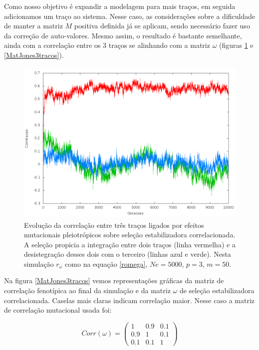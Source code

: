 Como nosso objetivo é expandir a modelagem para mais traços, em seguida
adicionamos um traço ao sistema. 
Nesse caso, as considerações sobre a dificuldade de manter a matriz $M$
positiva definida já se aplicam, sendo necessário fazer uso da correção
de auto-valores. 
Mesmo assim, o resultado é bastante semelhante, ainda com a correlação
entre os 3 traços se alinhando com a matriz $\omega$ (figuras
\ref{jones3tracos} e \ref{MatJones3tracos}). 

\begin{center}
\begin{figure}[htbp]
  \includegraphics[width=150mm, height=80mm]{figuras/jones3tracos.png}
  \caption{Evolução da correlação entre três traços ligados por efeitos
  mutacionais pleiotrópicos sobre seleção estabilizadora correlacionada.
  A seleção propicia a integração entre dois traços (linha vermelha) e a desistegração
  desses dois com o terceiro (linhas azul e verde). Nesta simulação
  $r_\omega$ como na equação \ref{romega}, $Ne=5000$, $p=3$, $m=50$.}
  \label{jones3tracos}
\end{figure}
\end{center}

Na figura \ref{MatJones3tracos} vemos representações gráficas da matriz
de correlação fenotípica ao final da simulação e da matriz $\omega$ de
seleção estabilizadora correlacionada. 
Caselas mais claras indicam correlação maior. 
Nesse caso a matriz de correlação mutacional usada foi:

\begin{equation}
Corr(\omega) = \left( \begin{smallmatrix} 1 & 0.9 & 0.1\\  0.9 & 1 & 0.1 \\ 0.1 & 0.1 & 1 \end{smallmatrix}  \right)
\label{romega}
\end{equation}


